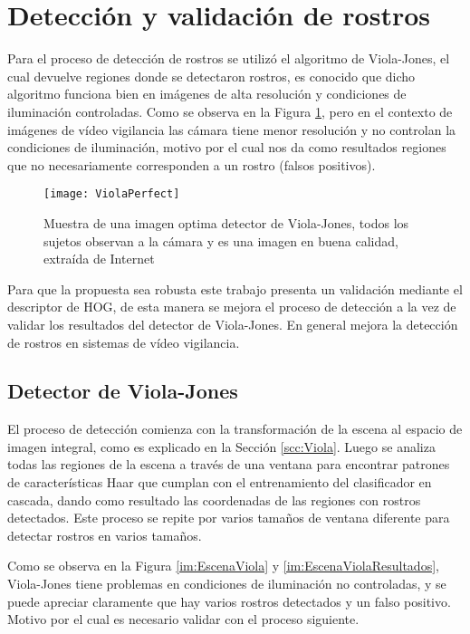 \section{Detección y validación de rostros} 
Para el proceso de detección de rostros se utilizó el algoritmo de Viola-Jones, el cual devuelve regiones donde se detectaron rostros, es conocido que dicho algoritmo funciona bien en imágenes de alta resolución y condiciones de iluminación controladas. Como se observa en la Figura \ref{im:ViolaPerfect}, pero en el contexto de imágenes de vídeo vigilancia las cámara tiene menor resolución y no controlan la condiciones de iluminación, motivo por el cual nos da como resultados regiones que no necesariamente corresponden a un rostro (falsos positivos).

\begin{figure}[h]
\center
\texttt{[image: ViolaPerfect]}
\caption{Muestra de una imagen optima detector de Viola-Jones, todos los sujetos observan a la cámara y es una imagen en buena calidad, extraída de Internet}
\label{im:ViolaPerfect}
\end{figure}

Para que la propuesta sea robusta este trabajo presenta un validación mediante el descriptor de \ac{HOG}, de esta manera se mejora el proceso de detección a la vez de validar los resultados del detector de Viola-Jones. En general mejora la detección de rostros en sistemas de vídeo vigilancia.

\subsection{Detector de Viola-Jones}

El proceso de detección comienza con la transformación de la escena al espacio de imagen integral, como es explicado en la Sección \ref{scc:Viola}. Luego se analiza todas las regiones de la escena a través de una ventana para encontrar patrones de características Haar que cumplan con el entrenamiento del clasificador en cascada, dando como resultado las coordenadas de las regiones con rostros detectados. Este proceso se repite por varios tamaños de ventana diferente para detectar rostros en varios tamaños.

Como se observa en la Figura \ref{im:EscenaViola} y \ref{im:EscenaViolaResultados}, Viola-Jones tiene problemas en condiciones de iluminación no controladas, y se puede apreciar claramente que hay varios rostros detectados y un falso positivo. Motivo por el cual es necesario validar con el proceso siguiente.

